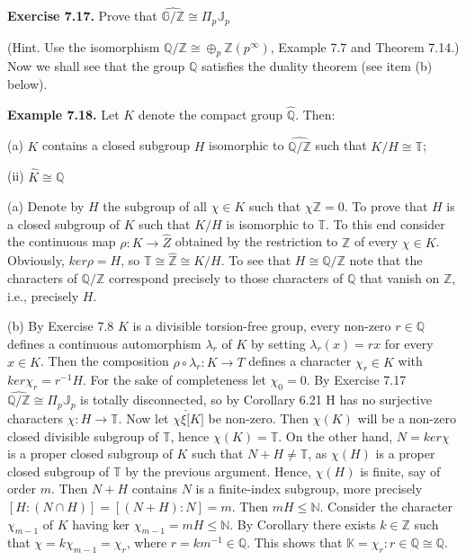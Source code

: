 \documentclass[12pt]{article}
\begin{document}
\textbf{Exercise 7.17.} Prove that $\hat{\mathbb{G}/\mathbb{Z}} \cong \Pi_p \mathbb{J}_p$


(Hint. Use the isomorphism $\mathbb{Q}/\mathbb{Z} \cong \oplus_p \mathbb{Z}(p^{\infty})$, Example 7.7 and Theorem 7.14.)
Now we shall see that the group $\mathbb{Q}$ satisfies the duality theorem (see item (b) below).


\textbf{Example 7.18.} Let $K$ denote the compact group $\hat{\mathbb{Q}}$. Then: 


    (a) $K$ contains a closed subgroup $H$ isomorphic to $\hat{\mathbb{Q}/\mathbb{Z}}$ such that $K/H \cong \mathbb{T}$;

    (ii) $\hat{K} \cong \mathbb{Q}$


    (a) Denote by $H$ the subgroup of all $\chi \in K$ such that $\chi{\mathbb{Z}} = 0$. To prove that $H$ is a closed subgroup of $K$ such
that $K/H$ is isomorphic to $\mathbb{T}$. To this end consider the continuous map $\rho : K \to \hat{Z}$ obtained by the restriction
to $\mathbb{Z}$ of every $\chi \in K$. Obviously, $ker \rho = H$, so $\mathbb{T} \cong \hat{\mathbb{Z}} \cong K/H$. To see that $H \cong \hat{\mathbb{Q}/\mathbb{Z}}$ note that the characters
of $\mathbb{Q}/\mathbb{Z}$ correspond precisely to those characters of $\mathbb{Q}$ that vanish on $\mathbb{Z}$, i.e., precisely $H$.

    
    (b) By Exercise 7.8 $K$ is a divisible torsion-free group, every non-zero $r \in \mathbb{Q}$ defines a continuous automorphism
$\lambda_r$ of $K$ by setting $\lambda_r(x) = rx$ for every $x \in K$. Then the composition $\rho \circ \lambda_r : K \to T$ defines a character
$\chi_r \in \hat{K}$ with $ker \chi_r = r^{-1} H$. For the sake of completeness let $\chi_0 = 0$. By Exercise 7.17 $\hat{\mathbb{Q}/\mathbb{Z}} \cong \Pi_p \mathbb{J}_p$ is totally
disconnected, so by Corollary 6.21 H has no surjective characters $\chi : H \to \mathbb{T}$. Now let $\chi \xi \hat[K]$ be non-zero.
Then $\chi(K)$ will be a non-zero closed divisible subgroup of $\mathbb{T}$, hence $\chi(K) = \mathbb{T}$. On the other hand, $N = ker \chi$ is
a proper closed subgroup of $K$ such that $N + H \neq \mathbb{T}$, as $\chi(H)$ is a proper closed subgroup of $\mathbb{T}$ by the previous
argument. Hence, $\chi(H)$ is finite, say of order $m$. Then $N + H$ contains $N$ is a finite-index subgroup, more
precisely $[H : (N \cap H)] = [(N + H) : N] = m$. Then $mH \leq \mathbb{N}$. Consider the character $\chi_{m-1}$ of $K$ having
ker $\chi_{m-1} = mH \leq \mathbb{N}$. By Corollary there exists $k \in \mathbb{Z}$ such that $\chi = k\chi_{m-1} = \chi_r$, where $r = km^{-1} \in \mathbb{Q}$. This
shows that $\mathbb{K} = {\chi_r : r \in \mathbb{Q}} \cong \mathbb{Q}$.
\end{document}
